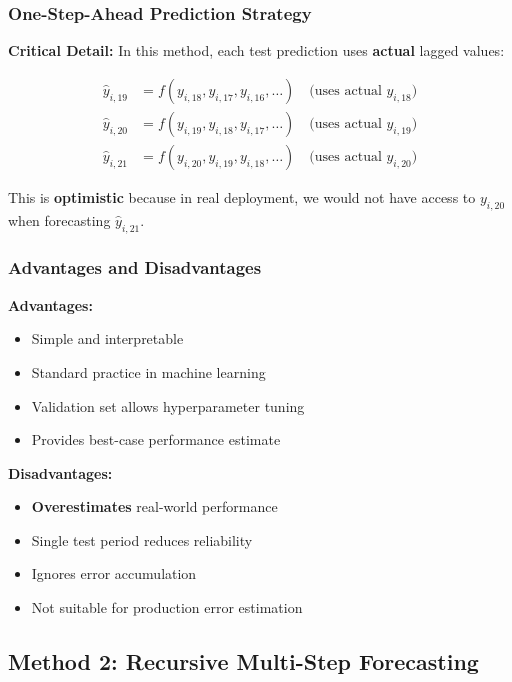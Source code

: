 \documentclass[12pt,a4paper]{article}
\begin{document}
\subsubsection{One-Step-Ahead Prediction Strategy}

\textbf{Critical Detail:} In this method, each test prediction uses \textbf{actual} lagged values:

\begin{align}
\hat{y}_{i,19} &= f(y_{i,18}, y_{i,17}, y_{i,16}, \ldots) \quad \text{(uses actual $y_{i,18}$)} \\
\hat{y}_{i,20} &= f(y_{i,19}, y_{i,18}, y_{i,17}, \ldots) \quad \text{(uses actual $y_{i,19}$)} \\
\hat{y}_{i,21} &= f(y_{i,20}, y_{i,19}, y_{i,18}, \ldots) \quad \text{(uses actual $y_{i,20}$)}
\end{align}

This is \textbf{optimistic} because in real deployment, we would not have access to $y_{i,20}$ when forecasting $\hat{y}_{i,21}$.

\subsubsection{Advantages and Disadvantages}

\textbf{Advantages:}
\begin{itemize}
    \item Simple and interpretable
    \item Standard practice in machine learning
    \item Validation set allows hyperparameter tuning
    \item Provides best-case performance estimate
\end{itemize}

\textbf{Disadvantages:}
\begin{itemize}
    \item \textbf{Overestimates} real-world performance
    \item Single test period reduces reliability
    \item Ignores error accumulation
    \item Not suitable for production error estimation
\end{itemize}

\subsection{Method 2: Recursive Multi-Step Forecasting}
\end{document}
